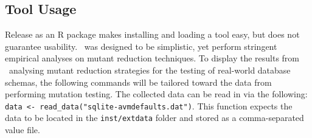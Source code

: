 \subsection{Tool Usage}





Release as an R package makes installing and loading a tool easy, but does not guarantee usability.
\mr~was designed to be simplistic, yet perform stringent empirical analyses on mutant reduction techniques. To
display the results from \mr~analysing mutant reduction strategies for the testing of real-world database schemas,
the following commands will be tailored toward the data from performing mutation testing. The collected data can
be read in via the following: {\small\texttt{data <- read\_data("sqlite-avmdefaults.dat")}}. This
function expects the data to be located in the \texttt{inst/extdata} folder and stored as a
comma-separated value file.








